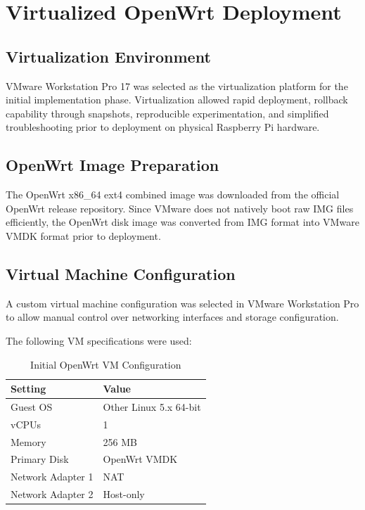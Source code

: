 \documentclass[conference]{IEEEtran}
\begin{document}
\section{Virtualized OpenWrt Deployment}

\subsection{Virtualization Environment}

VMware Workstation Pro 17 was selected as the virtualization platform for the initial implementation phase. Virtualization allowed rapid deployment, rollback capability through snapshots, reproducible experimentation, and simplified troubleshooting prior to deployment on physical Raspberry Pi hardware.

\subsection{OpenWrt Image Preparation}

The OpenWrt x86\_64 ext4 combined image was downloaded from the official OpenWrt release repository. Since VMware does not natively boot raw IMG files efficiently, the OpenWrt disk image was converted from IMG format into VMware VMDK format prior to deployment.

\subsection{Virtual Machine Configuration}

A custom virtual machine configuration was selected in VMware Workstation Pro to allow manual control over networking interfaces and storage configuration.

The following VM specifications were used:

\begin{table}[H]
\centering
\caption{Initial OpenWrt VM Configuration}
\begin{tabular}{|l|l|}
\hline
Setting & Value \\ \hline
Guest OS & Other Linux 5.x 64-bit \\ \hline
vCPUs & 1 \\ \hline
Memory & 256 MB \\ \hline
Primary Disk & OpenWrt VMDK \\ \hline
Network Adapter 1 & NAT \\ \hline
Network Adapter 2 & Host-only \\ \hline
\end{tabular}
\end{table}
\end{document}
